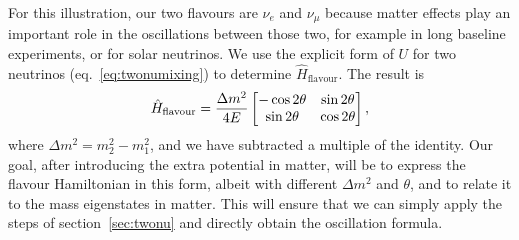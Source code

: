 For this illustration, our two flavours are $\nu_e$ and $\nu_\mu$ because matter effects play
an important role in the oscillations between those two, for example
in long baseline experiments, or for solar neutrinos.
We use the explicit form of $U$ for two neutrinos (eq.~\ref{eq:twonumixing}) to
determine $\hat{H}_\text{flavour}$. The result is
\begin{equation}\hat{H}_\text{flavour} = \frac{\Delta m^2}{4 E} \begin{bmatrix}-\cos 2\theta & \sin
	2\theta \\ \sin 2\theta & \cos
2\theta\end{bmatrix},\label{eq:flavourvacuum}\end{equation}
where $\Delta m^2 = m_2^2 - m_1^2$, and we have subtracted a multiple of the
identity. Our goal, after introducing the extra potential in matter, will be to
express the flavour Hamiltonian in this form, albeit with different $\Delta
m^2$ and $\theta$, and to relate it to the mass eigenstates in matter. This
will ensure that we can simply apply the steps of section~\ref{sec:twonu} and
directly obtain the oscillation formula.

